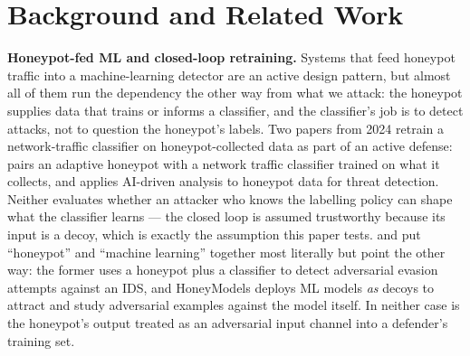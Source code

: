 \section{Background and Related Work}
\label{sec:background}

\textbf{Honeypot-fed ML and closed-loop retraining.} Systems that feed honeypot traffic into a
machine-learning detector are an active design pattern, but almost all of them run the
dependency the other way from what we attack: the honeypot supplies data that trains or informs
a classifier, and the classifier's job is to detect attacks, not to question the honeypot's
labels. Two papers from 2024 retrain a network-traffic classifier on honeypot-collected data as
part of an active defense: \citet{matcheswala2024creating} pairs an adaptive honeypot with a
network traffic classifier trained on what it collects, and \citet{lanka2024intelligent} applies
AI-driven analysis to honeypot data for threat detection. Neither evaluates whether an attacker
who knows the labelling policy can shape what the classifier learns — the closed loop is
assumed trustworthy because its input is a decoy, which is exactly the assumption this paper
tests. \citet{yugai2024honeypot} and \citet{abdou2021honeymodels} put “honeypot” and “machine
learning” together most literally but point the other way: the former uses a honeypot plus a
classifier to detect adversarial evasion attempts against an IDS, and HoneyModels deploys ML
models \emph{as} decoys to attract and study adversarial examples against the model itself. In
neither case is the honeypot's output treated as an adversarial input channel into a defender's
training set.

